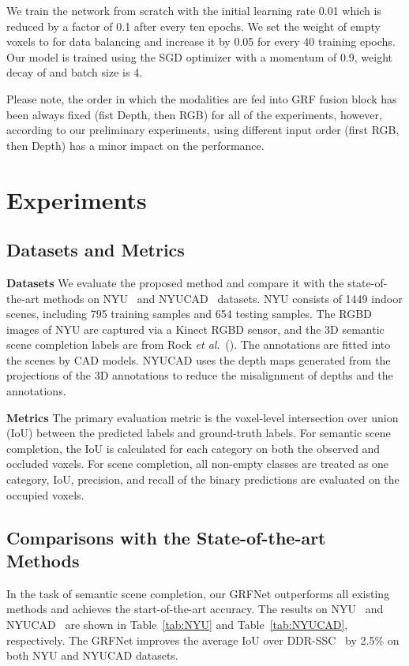 \documentclass[10pt,twocolumn,letterpaper]{article}
\def\etal{\emph{et al}.}
\begin{document}
We train the network from scratch with the initial learning rate 0.01 which is reduced by a factor of 0.1 after every ten epochs. 
We set the weight of empty voxels  to  for data balancing and increase it by 0.05 for every 40 training epochs. Our model is trained using the SGD optimizer with a momentum of 0.9, weight decay of  and batch size is 4.

Please note, the order in which the modalities are fed into GRF fusion block has been always fixed (fist Depth, then RGB) for all of the experiments, however, according to our preliminary experiments, using different input order (first RGB, then Depth) has a minor impact on the performance.
\section{Experiments}
\label{sec:experiments}
\subsection{Datasets and Metrics}
\noindent
\textbf{Datasets}
We evaluate the proposed method and compare it with the state-of-the-art methods on NYU~\cite{silberman2012indoor} and NYUCAD~\cite{firman2016NYUCAD} datasets.
NYU consists of 1449 indoor scenes, including 795 training samples and 654 testing samples. The RGBD images of NYU are captured via a Kinect RGBD sensor, and the 3D semantic scene completion labels are from Rock \etal~(\cite{rock2015completing}). The annotations are fitted into the scenes by CAD models.
NYUCAD uses the depth maps generated from the projections of the 3D annotations to reduce the misalignment of depths and the annotations. 

\noindent
\textbf{Metrics}
The primary evaluation metric is the voxel-level intersection over union (IoU) between the predicted labels and ground-truth labels. 
For semantic scene completion, the IoU is calculated for each category on both the observed and occluded voxels. 
For scene completion, all non-empty classes are treated as one category, IoU, precision, and recall of the binary predictions are evaluated on the occupied voxels.

\subsection{Comparisons with the State-of-the-art Methods}
In the task of semantic scene completion, our GRFNet outperforms all existing methods and achieves the start-of-the-art accuracy.
The results on NYU~\cite{silberman2012indoor} and NYUCAD~\cite{firman2016NYUCAD} are shown in Table~\ref{tab:NYU} and Table~\ref{tab:NYUCAD}, respectively.
The GRFNet improves the average IoU over DDR-SSC~\cite{li2019rgbd} by 2.5\% on both NYU and NYUCAD datasets.
\end{document}
